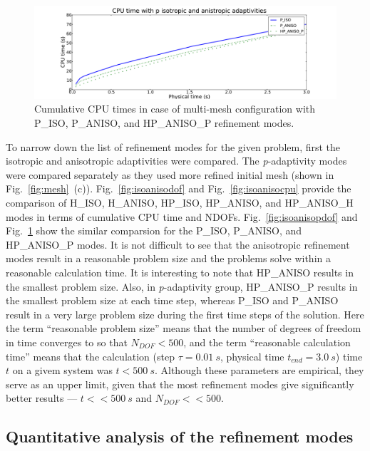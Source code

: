 \begin{figure}[!ht]
  \begin{centering}
  \includegraphics[width=\columnwidth]{isoanisop_cpu}
  \caption{\label{fig:isoanisopcpu} Cumulative CPU times in case 
  of multi-mesh configuration with P\_ISO, P\_ANISO, and
  HP\_ANISO\_P refinement modes.}
  \end{centering}
\end{figure}
To narrow down the list of refinement modes for the given problem, first the
isotropic and anisotropic adaptivities were compared. The \emph{p}-adaptivity
modes were compared separately as they used more refined initial mesh 
(shown in Fig.~\ref{fig:mesh}~(c)).
Fig.~\ref{fig:isoanisodof} and Fig.~\ref{fig:isoanisocpu} provide the comparison
of H\_ISO, H\_ANISO, HP\_ISO, HP\_ANISO, and HP\_ANISO\_H modes in terms of 
cumulative CPU time and NDOFs.
Fig.~\ref{fig:isoanisopdof} and Fig.~\ref{fig:isoanisopcpu} show the similar
comparsion for the P\_ISO, P\_ANISO, and HP\_ANISO\_P modes.
It is not difficult to see that the anisotropic refinement modes result in a reasonable problem
size and the problems solve within a reasonable calculation time. It is interesting
to note that HP\_ANISO results in the smallest problem size. Also, in
\emph{p}-adaptivity group, HP\_ANISO\_P results in the smallest problem size
at each time step, whereas P\_ISO and P\_ANISO result in a very large problem size
during the first time steps of the solution.
Here the term ``reasonable problem size''
means that the number of degrees of freedom in time converges
to so that $N_{DOF}<500$, and the term ``reasonable calculation time''
means that the calculation (step $\tau=0.01\ s$, physical
time $t_{end}=3.0\ s$) time $t$ on a givem system was $t<500\ s$.
Although these parameters are empirical, they serve as an upper limit, given
that the most refinement modes give significantly better results ---
$t<<500\ s$ and $N_{DOF} << 500$.

\subsection{Quantitative analysis of the refinement modes}

